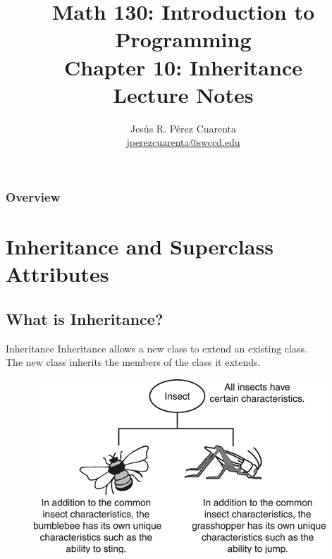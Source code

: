 \documentclass[11pt]{beamer}
\title[Chapter 10 Notes]{Math 130: Introduction to Programming \\ Chapter 10: Inheritance \\ Lecture Notes}
\author{Jesús R. Pérez Cuarenta \\
\href{mailto:jperezcuarenta@swccd.edu}{jperezcuarenta@swccd.edu}
}
\date{} %
\begin{document}
% 
% 

\begin{frame}
  \maketitle
\end{frame}

\begin{frame}
\frametitle{Overview}
    \tableofcontents
\end{frame}

\section{Inheritance and Superclass Attributes}
\subsection{What is Inheritance?}
\begin{frame}{Inheritance}
    Inheritance allows a new class to extend an existing class. \\ \vspace{1em}
    The new class inherits the members of the class it extends.
    \noindent 
    \begin{figure}[H]
    \centering
    \includegraphics[scale=0.7]{Images/chapter10_section01_inheritInsects.png}
    \end{figure}
\end{frame}
\end{document}
